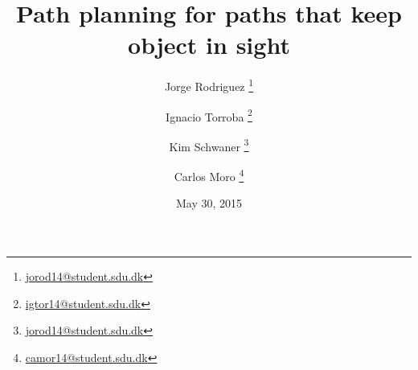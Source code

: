 
\title{Path planning for paths that keep object in sight}
\date{May 30, 2015}
\author{Jorge Rodriguez \thanks{\href{mailto:jorod14@student.sdu.dk}{jorod14@student.sdu.dk}}}
\author{Ignacio Torroba \thanks{\href{mailto:igtor14@student.sdu.dk}{igtor14@student.sdu.dk}}}
\author{Kim Schwaner \thanks{\href{mailto:jorod14@student.sdu.dk}{jorod14@student.sdu.dk}}}
\author{Carlos Moro \thanks{\href{mailto:camor14@student.sdu.dk}{camor14@student.sdu.dk}}}
